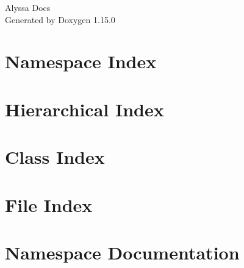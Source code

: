 \documentclass[twoside]{book}
\newcommand{\+}{\discretionary{\mbox{\scriptsize$\hookleftarrow$}}{}{}}
\newcommand{\clearemptydoublepage}{%
    \newpage{\pagestyle{empty}\cleardoublepage}%
  }
\begin{document}
  \raggedbottom
    \hypersetup{pageanchor=false,
                bookmarksnumbered=true,
                pdfencoding=unicode
               }
  \begin{titlepage}
  \vspace*{7cm}
  \begin{center}%
  {\Large Alyssa Docs}\\
  \vspace*{1cm}
  {\large Generated by Doxygen 1.15.0}\\
  \end{center}
  \end{titlepage}
  \clearemptydoublepage
  \tableofcontents
  \clearemptydoublepage
  \hypersetup{pageanchor=true}

\chapter{Namespace Index}

\chapter{Hierarchical Index}

\chapter{Class Index}

\chapter{File Index}

\chapter{Namespace Documentation}



\end{document}
